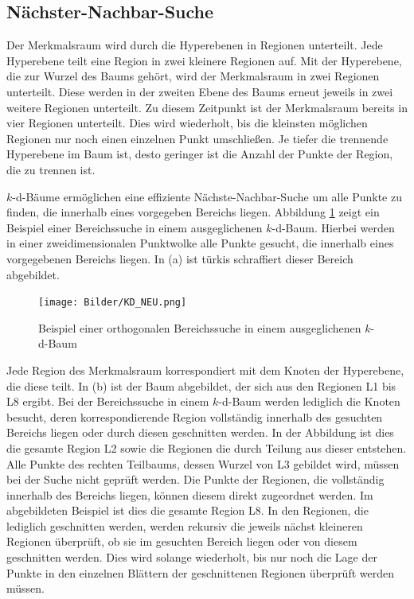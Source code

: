 

\subsection[Nächster-Nachbar-Suche (Schmelzer)]{Nächster-Nachbar-Suche}

Der Merkmalsraum wird durch die Hyperebenen in Regionen unterteilt. Jede Hyperebene teilt eine Region in zwei kleinere Regionen auf. Mit der Hyperebene, die zur Wurzel des Baums gehört, wird der Merkmalsraum in zwei Regionen unterteilt. Diese werden in der zweiten Ebene des Baums erneut jeweils in zwei weitere Regionen unterteilt. Zu diesem Zeitpunkt ist der Merkmalsraum bereits in vier Regionen unterteilt. Dies wird wiederholt, bis die kleinsten möglichen Regionen nur noch einen einzelnen Punkt umschließen. 
Je tiefer die trennende Hyperebene im Baum ist, desto geringer ist die Anzahl der Punkte der Region, die zu trennen ist.

$k$-d-Bäume ermöglichen eine effiziente Nächste-Nachbar-Suche um alle Punkte zu finden, die innerhalb eines vorgegeben Bereichs liegen. Abbildung \ref{fig:Suche} zeigt ein Beispiel einer Bereichssuche in einem ausgeglichenen $k$-d-Baum. Hierbei werden in einer zweidimensionalen Punktwolke alle Punkte gesucht, die innerhalb eines vorgegebenen Bereichs liegen. In (a) ist türkis schraffiert dieser Bereich abgebildet. 

\begin{figure}
    \centering
    \texttt{[image: Bilder/KD\_NEU.png]}
    \caption{Beispiel einer orthogonalen Bereichssuche in einem ausgeglichenen $k$-d-Baum}
    \label{fig:Suche}
\end{figure}

Jede Region des Merkmalsraum korrespondiert mit dem Knoten der Hyperebene, die diese teilt. In (b) ist der Baum abgebildet, der sich aus den Regionen L1 bis L8 ergibt. Bei der Bereichssuche in einem $k$-d-Baum werden lediglich die Knoten besucht, deren korrespondierende Region vollständig innerhalb des gesuchten Bereichs liegen oder durch diesen geschnitten werden. In der Abbildung ist dies die gesamte Region L2 sowie die Regionen die durch Teilung aus dieser entstehen. Alle Punkte des rech\-ten Teilbaums, dessen Wurzel von L3 gebildet wird, müssen bei der Suche nicht geprüft werden. Die Punkte der Regionen, die vollständig innerhalb des Bereichs liegen, können diesem direkt zugeordnet werden. Im abgebildeten Beispiel ist dies die gesamte Region L8. In den Regionen, die lediglich geschnitten werden, werden rekursiv die je\-weils nächst kleineren Regionen überprüft, ob sie im gesuchten Bereich liegen oder von diesem geschnitten werden. Dies wird solange wiederholt, bis nur noch die Lage der Punkte in den einzelnen Blättern der geschnittenen Regionen überprüft werden müssen. 

